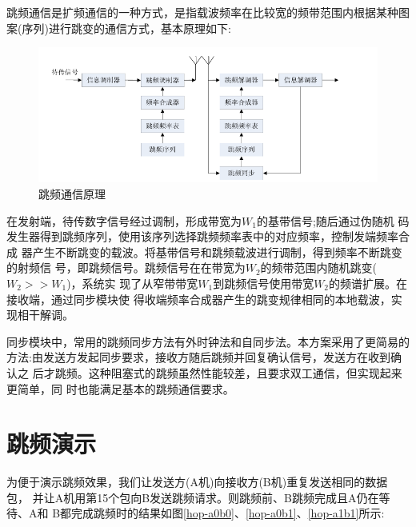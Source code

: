 \documentclass[12pt]{ctexart}
\begin{document}
	跳频通信是扩频通信的一种方式，是指载波频率在比较宽的频带范围内根据某种图
案(序列)进行跳变的通信方式，基本原理如下:
\begin{figure}[htbp]
	\centering
 	\includegraphics[scale=0.65]{../figures/hop-prin.png}
	\caption{跳频通信原理}
	\label{hop-prin}
\end{figure}

	在发射端，待传数字信号经过调制，形成带宽为$W_1$的基带信号;随后通过伪随机
码发生器得到跳频序列，使用该序列选择跳频频率表中的对应频率，控制发端频率合成
器产生不断跳变的载波。将基带信号和跳频载波进行调制，得到频率不断跳变的射频信
号，即跳频信号。跳频信号在在带宽为$W_2$的频带范围内随机跳变($W_2>>W_1$)，系统实
现了从窄带带宽$W_1$到跳频信号使用带宽$W_2$的频谱扩展。在接收端，通过同步模块使
得收端频率合成器产生的跳变规律相同的本地载波，实现相干解调。

	同步模块中，常用的跳频同步方法有外时钟法和自同步法。本方案采用了更简易的
方法:由发送方发起同步要求，接收方随后跳频并回复确认信号，发送方在收到确认之
后才跳频。这种阻塞式的跳频虽然性能较差，且要求双工通信，但实现起来更简单，同
时也能满足基本的跳频通信要求。

\section{跳频演示}
为便于演示跳频效果，我们让发送方(A机)向接收方(B机)重复发送相同的数据包，
并让A机用第15个包向B发送跳频请求。则跳频前、B跳频完成且A仍在等待、A和
B都完成跳频时的结果如图\ref{hop-a0b0}、\ref{hop-a0b1}、\ref{hop-a1b1}所示:
\end{document}
